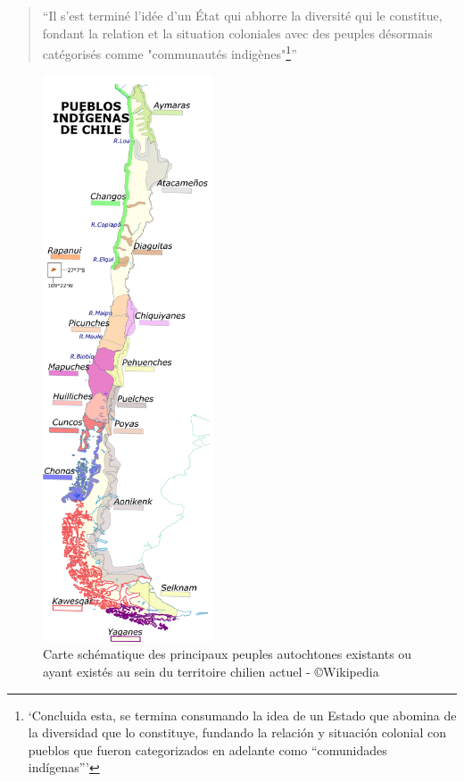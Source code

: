 	\begin{quote}
	    \enquote{Il s'est terminé l'idée d'un État qui abhorre la diversité qui le constitue, fondant la relation et la situation coloniales avec des peuples désormais catégorisés comme "communautés indigènes"\footnote{\enquote{Concluida esta, se termina consumando la idea de un  Estado  que  abomina  de  la  diversidad  que  lo  constituye,  fundando  la  relación  y  situación  colonial  con  pueblos  que  fueron  categorizados  en  adelante  como  “comunidades indígenas”}\cite{quemenadoGeoestrategiaConflictoChileno2017a}}}
	\end{quote}
	
	\begin{figure}[p]
	    \centering
	    \includegraphics[width= 0.45\textwidth]{annexes/carte/carte_peuples.png}
	    \caption{Carte schématique des principaux peuples autochtones existants ou ayant existés au sein du territoire chilien actuel - \copyright Wikipedia}
	    \label{fig:carte_chili}
	\end{figure}
	
